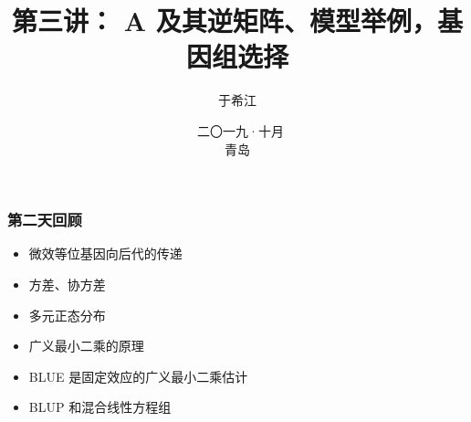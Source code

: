 \documentclass[serif,aspectratio=169]{beamer}
\begin{document}
\title{第三讲： A 及其逆矩阵、模型举例，基因组选择}
\author{于希江}
\date{\tiny{~{二〇一九·十月} \\青岛}}


\begin{frame}
  \frametitle{第二天回顾}
  \begin{itemize}
  \item 微效等位基因向后代的传递
  \item 方差、协方差
  \item 多元正态分布
  \item 广义最小二乘的原理
  \item BLUE 是固定效应的广义最小二乘估计
  \item BLUP 和混合线性方程组
  \end{itemize}
\end{frame}
\end{document}
